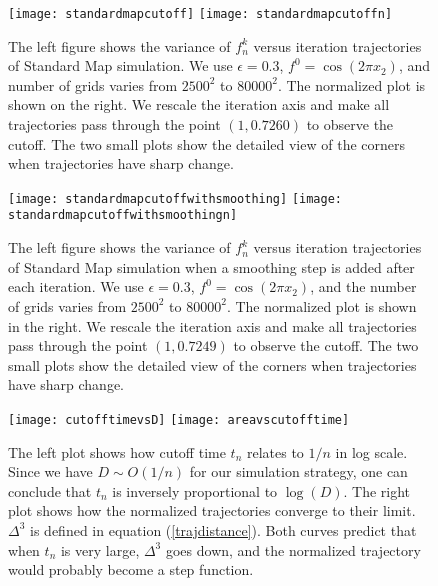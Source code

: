 
\begin{figure}
    \centerline{
      \texttt{[image: standardmapcutoff]}
      \texttt{[image: standardmapcutoffn]}
    }
    \caption{The left figure shows the variance of $f_n^k$ versus iteration trajectories of Standard Map simulation. We use $\epsilon=0.3$, $f^0=\cos(2 \pi x_2)$, and number of grids varies from $2500^2$ to $80000^2$. The normalized plot is shown on the right. We rescale the iteration axis and make all trajectories pass through the point $(1,0.7260)$ to observe the cutoff. The two small plots show the detailed view of the corners when trajectories have sharp change.}
 \label{standardmapun}
\end{figure}


\begin{figure}
    \centerline{
      \texttt{[image: standardmapcutoffwithsmoothing]}
      \texttt{[image: standardmapcutoffwithsmoothingn]}
    }
     \caption{The left figure shows the variance of $f_n^k$ versus iteration trajectories of Standard Map simulation when a smoothing step is added after each iteration. We use $\epsilon=0.3$, $f^0=\cos(2 \pi x_2)$, and the number of grids varies from $2500^2$ to $80000^2$. The normalized plot is shown in the right. We rescale the iteration axis and make all trajectories pass through the point $(1,0.7249)$ to observe the cutoff. The two small plots show the detailed view of the corners when trajectories have sharp change.}
\label{smoothingstandardmapun}
\end{figure}


\begin{figure}
   \label{cutofftime}
    \centerline{
      \texttt{[image: cutofftimevsD]}
      \texttt{[image: areavscutofftime]}
          }
     \caption{\label{cutofftimeandarea} The left plot shows how cutoff time $t_n$ relates to $1/n$ in log scale. Since we have $D \sim O(1/n) $ for our simulation strategy, one can conclude that $t_n$ is inversely proportional to $\log(D)$. The right plot shows how the normalized trajectories converge to their limit. $\Delta^3$ is defined in equation (\ref{trajdistance}). Both curves predict that when $t_n$ is very large, $\Delta^3$ goes down, and the normalized trajectory would probably become a step function.}
\end{figure}
